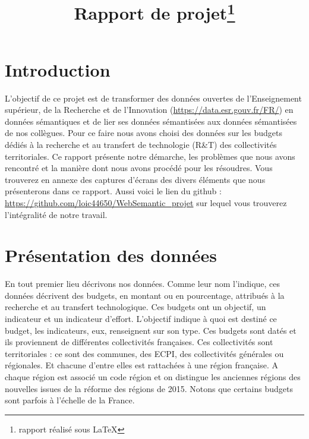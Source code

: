 \documentclass[a4paper,sffamily,12pt]{article}
\title{\vspace{\fill}\LARGE\bfseries\sffamily Rapport de projet\protect\footnote{rapport réalisé sous \LaTeX} \vspace{\fill}}
\begin{document}
	\date{} %
	\maketitle %

	\thispagestyle{fancy} %
	
	\newpage
			
	\renewcommand{\contentsname}{Sommaire}
	\tableofcontents
	
	\newpage
	
	\section{Introduction}

		\vspace{0.5cm}

		L’objectif de ce projet est de transformer des données ouvertes de l'Enseignement supérieur, de la Recherche et de l'Innovation (\url{https://data.esr.gouv.fr/FR/}) en données sémantiques et de lier ses données sémantisées aux données sémantisées de nos collègues. Pour ce faire nous avons choisi des données sur les budgets dédiés à la recherche et au transfert de technologie (R\&T) des collectivités territoriales. Ce rapport présente notre démarche, les problèmes que nous avons rencontré et la manière dont nous avons procédé pour les résoudres. Vous trouverez en annexe des captures d'écrans des divers éléments que nous présenterons dans ce rapport. Aussi voici le lien du github : \url{https://github.com/loic44650/WebSemantic_projet} sur lequel vous trouverez l'intégralité de notre travail. \\

		\vspace{0.5cm}
		
	\section{Présentation des données}				

		\vspace{0.5cm}
		
		En tout premier lieu décrivons nos données. Comme leur nom l'indique, ces données décrivent des budgets, en montant ou en pourcentage, attribués à la recherche et au transfert technologique. Ces budgets ont un objectif, un indicateur et un indicateur d'effort. L'objectif indique à quoi est destiné ce budget, les indicateurs, eux, renseignent sur son type. Ces budgets sont datés et ils proviennent de différentes collectivités françaises. Ces collectivités sont territoriales : ce sont des communes, des ECPI, des collectivités générales ou régionales. Et chacune d'entre elles est rattachées à une région française. A chaque région est associé un code région et on distingue les anciennes régions des nouvelles issues de la réforme des régions de 2015. Notons que certains budgets sont parfois à l’échelle de la France. 
				
\end{document}

